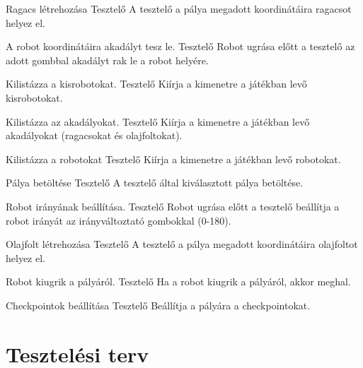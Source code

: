 {Ragacs létrehozása}
{Tesztelő}
{A tesztelő a pálya megadott koordinátáira ragacsot helyez el.}

{A robot koordinátáira akadályt tesz le.}
{Tesztelő}
{Robot ugrása előtt a tesztelő az adott gombbal akadályt rak le a robot helyére.}

{Kilistázza a kisrobotokat.}
{Tesztelő}
{Kiírja a kimenetre a játékban levő kisrobotokat.}

{Kilistázza az akadályokat.}
{Tesztelő}
{Kiírja a kimenetre a játékban levő akadályokat (ragacsokat és olajfoltokat).}

{Kilistázza a robotokat}
{Tesztelő}
{Kiírja a kimenetre a játékban levő robotokat.}

{Pálya betöltése}
{Tesztelő}
{A tesztelő által kiválasztott pálya betöltése.}

{Robot irányának beállítása.}
{Tesztelő}
{Robot ugrása előtt a tesztelő beállítja a robot irányát az irányváltoztató gombokkal (0-180).}
\newpage

{Olajfolt létrehozása}
{Tesztelő}
{A tesztelő a pálya megadott koordinátáira olajfoltot helyez el.}

{Robot kiugrik a pályáról.}
{Tesztelő}
{Ha a robot kiugrik a pályáról, akkor meghal.}

{Checkpointok beállítása}
{Tesztelő}
{Beállítja a pályára a checkpointokat.}

\pagebreak
\section{Tesztelési terv}

